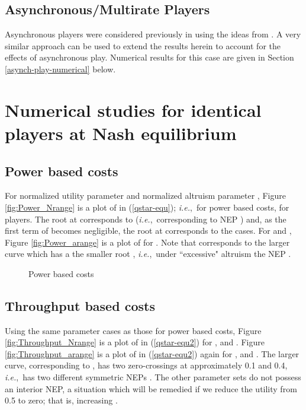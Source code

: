 \documentclass[12pt,onecolumn,draftcls]{IEEEtran}
\newcommand{\ie}{{\em i.e.},~}
\begin{document}
\subsection{Asynchronous/Multirate Players}\label{asynch-play}

Asynchronous players were considered previously in \cite{Jin05}
using the ideas from \cite{Basar95, Bertsekas89}. A very similar approach
can be used to extend the results herein to account for the effects of
asynchronous play.  Numerical results for this case are given in Section
\ref{asynch-play-numerical} below.




\section{Numerical studies for identical players at Nash equilibrium}\label{num-sec}



\subsection{Power based costs}\label{numerical-throughput}
For normalized utility  parameter  and normalized altruism parameter
, Figure \ref{fig:Power_Nrange} is a plot
of  in (\ref{qstar-equ}); \ie for power
based costs, for  players. The root at  corresponds to
 (\ie corresponding to NEP )  and, as the first term of 
becomes negligible, the root at  corresponds to the  cases.
For  and , Figure \ref{fig:Power_arange} is a plot of  for
.  Note that  corresponds to the larger curve which has
a the smaller root , \ie under ``excessive" altruism the NEP
.

\begin{figure}[ht]
\centering
{}
\caption{Power based costs}\label{fig:Power}
\end{figure}


\subsection{Throughput based costs}
Using the same parameter cases as those for power based costs, Figure
\ref{fig:Throughput_Nrange} is a plot of  in (\ref{qstar-equ2})
for ,  and .  Figure \ref{fig:Throughput_arange} is a
plot of  in (\ref{qstar-equ2}) again for ,  and
.  The larger curve, corresponding to , has two
zero-crossings  at approximately 0.1 and 0.4, \ie has two different
symmetric NEPs .  The other parameter sets do not possess an
interior NEP, a situation which will be remedied if we reduce the utility
 from 0.5 to zero; that is, increasing .
\end{document}
